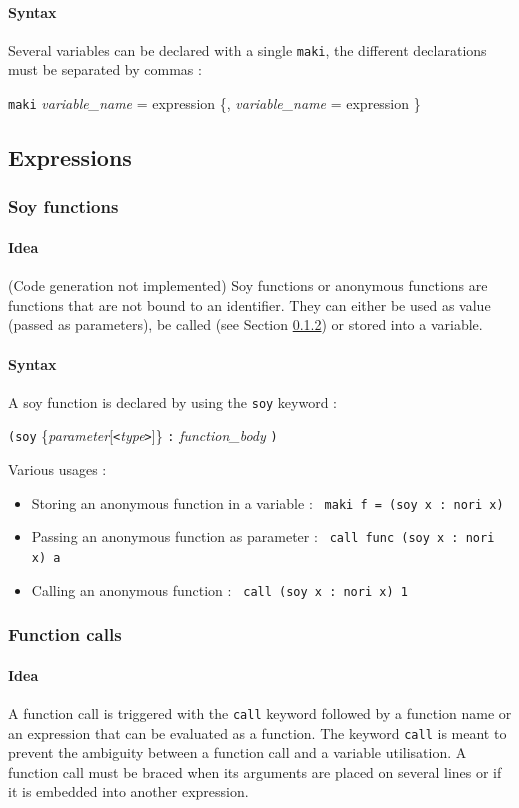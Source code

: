 \documentclass[a4paper,11pt]{article}
\begin{document}
\paragraph{Syntax} Several variables can be declared with a single \texttt{maki}, the different declarations must be separated by commas :
\begin{center}
\texttt{maki} \textit{variable\_name} = expression \{, \textit{variable\_name} = expression \}
\end{center}
\subsection{Expressions}
\subsubsection{Soy functions}
\paragraph{Idea} (Code generation not implemented) Soy functions or anonymous functions are functions that are not bound to an identifier. They can either be used as value (passed as parameters), be called (see Section \ref{sssec:func_call}) or stored into a variable.
\paragraph{Syntax} A soy function is declared by using the \texttt{soy} keyword :
\begin{center}
	\texttt{(soy} \{\textit{parameter}[\texttt{<}\textit{type}\texttt{>}]\} \texttt{:} \textit{function\_body} \texttt{)}
\end{center}
Various usages :
\begin{itemize}
	\item Storing an anonymous function in a variable : \texttt{ maki f = (soy x : nori x) }
	\item Passing an anonymous function as parameter : \texttt{ call func (soy x : nori x) a }
	\item Calling an anonymous function : \texttt{ call (soy x : nori x) 1 }
\end{itemize}
\label{sssec:soy_func}
\subsubsection{Function calls}
\label{sssec:func_call}
\paragraph{Idea} A function call is triggered with the \texttt{call} keyword followed by a function name or an expression that can be evaluated as a function.  The keyword \texttt{call} is meant to prevent the ambiguity between a function call and a variable utilisation. A function call must be braced when its arguments are placed on several lines or if it is embedded into another expression.
\end{document}
